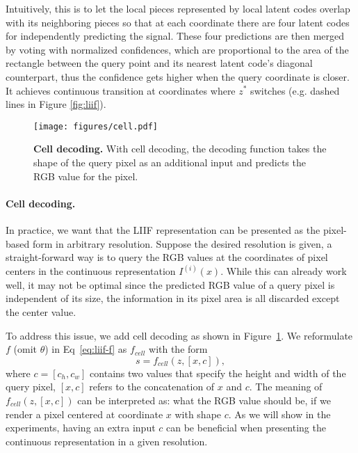 \documentclass[final]{cvpr}
\begin{document}
Intuitively, this is to let the local pieces represented by local latent codes overlap with its neighboring pieces so that at each coordinate there are four latent codes for independently predicting the signal. These four predictions are then merged by voting with normalized confidences, which are proportional to the area of the rectangle between the query point and its nearest latent code's diagonal counterpart, thus the confidence gets higher when the query coordinate is closer. It achieves continuous transition at coordinates where $z^*$ switches (e.g. dashed lines in Figure \ref{fig:liif}).

\begin{figure}
    \centering
    \texttt{[image: figures/cell.pdf]}
    \caption{\textbf{Cell decoding.} With cell decoding, the decoding function takes the shape of the query pixel as an additional input and predicts the RGB value for the pixel.}
    \label{fig:cell}
\end{figure}

\vspace{-1em}
\paragraph{Cell decoding.} In practice, we want that the LIIF representation can be presented as the pixel-based form in arbitrary resolution. Suppose the desired resolution is given, a straight-forward way is to query the RGB values at the coordinates of pixel centers in the continuous representation $I^{(i)}(x)$. While this can already work well, it may not be optimal since the predicted RGB value of a query pixel is independent of its size, the information in its pixel area is all discarded except the center value.

To address this issue, we add cell decoding as shown in Figure~\ref{fig:cell}. We reformulate $f$ (omit $\theta$) in Eq~\ref{eq:liif-f} as $f_{cell}$ with the form
\begin{equation}
    s = f_{cell}(z, [x, c]),
\end{equation}
where $c=[c_h,c_w]$ contains two values that specify the height and width of the query pixel, $[x, c]$ refers to the concatenation of $x$ and $c$. The meaning of $f_{cell}(z, [x, c])$ can be interpreted as: what the RGB value should be, if we render a pixel centered at coordinate $x$ with shape $c$. As we will show in the experiments, having an extra input $c$ can be beneficial when presenting the continuous representation in a given resolution.
\end{document}
